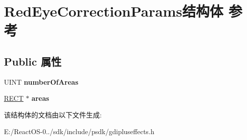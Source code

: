\hypertarget{struct_red_eye_correction_params}{}\section{Red\+Eye\+Correction\+Params结构体 参考}
\label{struct_red_eye_correction_params}
\subsection*{Public 属性}
\begin{DoxyCompactItemize}
\item 
\mbox{\label{struct_red_eye_correction_params_a3ac9583e2862db9bbb393db9c4bab188}} 
U\+I\+NT {\bfseries number\+Of\+Areas}
\item 
\mbox{\label{struct_red_eye_correction_params_a5175768ac5a0af5befc429b8f516187d}} 
\hyperlink{structtag_r_e_c_t}{R\+E\+CT} $\ast$ {\bfseries areas}
\end{DoxyCompactItemize}


该结构体的文档由以下文件生成\+:\begin{DoxyCompactItemize}
\item 
E\+:/\+React\+O\+S-\/0../sdk/include/psdk/gdipluseffects.\+h\end{DoxyCompactItemize}
